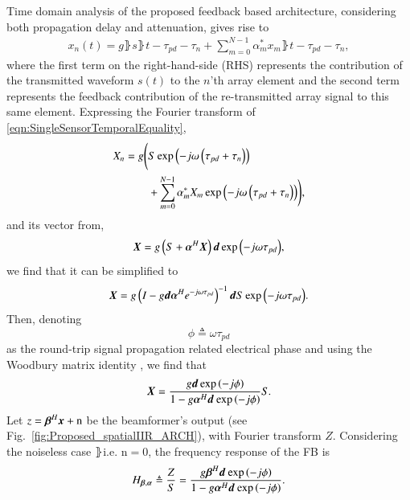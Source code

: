 Time domain analysis of the proposed feedback based architecture, considering both propagation delay and attenuation, gives rise to
\begin{equation}
    \label{eqn:SingleSensorTemporalEquality}
        \begin{split}
            x_{n}(t) = g\rBrace{s\rBrace{t-\tau_{pd}-\tau_{n}}
            +\sum_{m=0}^{N-1}{\alpha^{*}_{m}x_{m}\rBrace{t-\tau_{pd}-\tau_{n}}}},
        \end{split}
\end{equation}
where the first term on the right-hand-side (RHS) represents the contribution of the transmitted waveform $s(t)$ to the $n$'th array element and the second term represents the feedback contribution of the re-transmitted array signal to this same element.
Expressing the Fourier transform of \eqref{eqn:SingleSensorTemporalEquality},
\begin{equation}
    \label{eqn_singleSensorFourier}
        \begin{split}
            \F{x}_{n} =
            g\Bigg( & \F{s}
            \exp\rBrace{-j\omega\rBrace{\tau_{pd}+\tau_{n}}}
            \\&+\sum_{m=0}^{N-1}
            {
            \alpha^{*}_{m}\omegaB\F{x}_{m}
            \exp\rBrace{-j\omega\rBrace{\tau_{pd}+\tau_{n}}}
            }\Bigg),
        \end{split}
\end{equation}
and its vector from,
$$
\F{\vx} = g\rBrace{\F{s}+\vAlphaH \F{\vx}}\vd\exp{\rBrace{-j\omega\tau_{pd}}},
$$
we find that it can be simplified to
$$
\F{\vx} =g\rBrace{I-g\vd\vAlphaH{}e^{-j\omega\tau_{pd}}}^{-1}\vd\F{s}\exp{\rBrace{-j\omega\tau_{pd}}}.
$$
Then, denoting
\[
\phi\triangleq\omega\tau_{pd}
\]
as the round-trip signal propagation related electrical phase and using the Woodbury matrix identity \cite{woodbury1950inverting}, we find that
$$
\F{\vx}
=
\frac{    
g\vd\exp{\rBrace{-j\phi}}
}{
1 - g\aHd{}\exp{\rBrace{-j\phi}}
}\F{s}.
$$
Let $z=\vBetaH{}\vecnot{x}+\text{n}$ be the beamformer's output (see Fig.~\ref{fig:Proposed_spatialIIR_ARCH}), with Fourier transform $Z$. Considering the noiseless case $\rBrace{\text{i.e. n}=0}$, the frequency response of the FB is 
\begin{equation}
\label{eqn:GeneralFeedbackTransferFunction}
\Hba
\triangleq
\frac{\F{z}}{\F{s}} 
=
\frac{    
g\bHd{}\exp\rBrace{-j\phi}
}{
1 - g\aHd{}\exp\rBrace{-j\phi}
}.
\end{equation}
